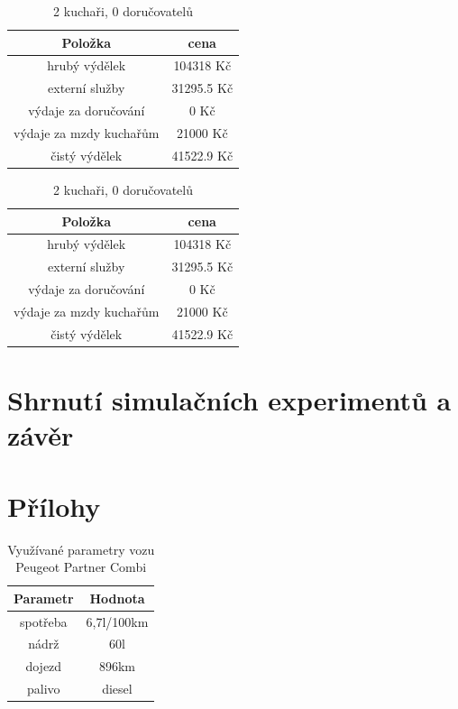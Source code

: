 \documentclass[a4paper, 11pt]{article}
\begin{document}
\begin{table}[h]
\centering
\begin{tabular}{cc}
\textbf{Položka} & \textbf{cena}                                                                                   \\ \hline
hrubý výdělek & 104318 Kč \\ \hline
externí služby  & 31295.5 Kč \\ \hline                      
výdaje za doručování &  0 Kč \\ \hline
výdaje za mzdy kuchařům &  21000 Kč \\ \hline
čistý výdělek &  41522.9 Kč
\end{tabular}
\caption{2 kuchaři, 0 doručovatelů}
\end{table}

\begin{table}[h]
\centering
\begin{tabular}{cc}
\textbf{Položka} & \textbf{cena}                                                                                   \\ \hline
hrubý výdělek & 104318 Kč \\ \hline
externí služby  & 31295.5 Kč \\ \hline                      
výdaje za doručování &  0 Kč \\ \hline
výdaje za mzdy kuchařům &  21000 Kč \\ \hline
čistý výdělek &  41522.9 Kč
\end{tabular}
\caption{2 kuchaři, 0 doručovatelů}
\end{table}

\newpage
\section{Shrnutí simulačních experimentů a závěr}

\newpage
\section*{Přílohy}
\begin{table}[h]
\centering
\begin{tabular}{cc}
\textbf{Parametr} & \textbf{Hodnota}                                                                                   \\ \hline
spotřeba & 6,7l/100km \\ \hline
nádrž  & 60l \\ \hline                      
dojezd &  896km \\ \hline
palivo & diesel
\end{tabular}
\caption{Využívané parametry vozu Peugeot Partner Combi}
\label{tab:1}
\end{table}
\end{document}
